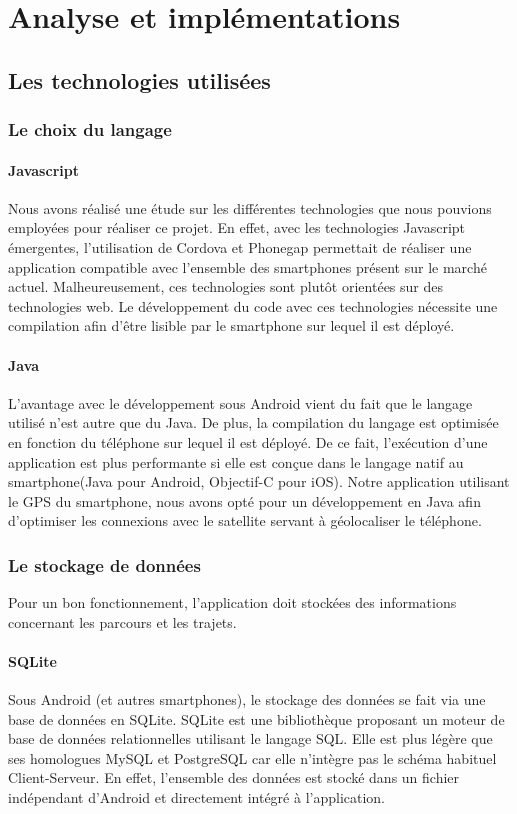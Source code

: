 \part{Analyse et implémentations}
\chapter{Les technologies utilisées}
\section{Le choix du langage}

\subsection{Javascript}
Nous avons réalisé une étude sur les différentes technologies que nous pouvions employées pour réaliser ce projet. En effet, avec les technologies Javascript émergentes, l'utilisation de Cordova et Phonegap permettait de réaliser une application compatible avec l'ensemble des smartphones présent sur le marché actuel. Malheureusement, ces technologies sont plutôt orientées sur des technologies web. Le développement du code avec ces technologies nécessite une compilation afin d'être lisible par le smartphone sur lequel il est déployé. 

\subsection{Java}
L'avantage avec le développement sous Android vient du fait que le langage utilisé n'est autre que du Java. De plus, la compilation du langage est optimisée en fonction du téléphone sur lequel il est déployé. De ce fait, l’exécution d'une application est plus performante si elle est conçue dans le langage natif au smartphone(Java pour Android, Objectif-C pour iOS). Notre application utilisant le GPS du smartphone, nous avons opté pour un développement en Java afin d'optimiser les connexions avec le satellite servant à géolocaliser le téléphone.

\section{Le stockage de données}
Pour un bon fonctionnement, l'application doit stockées des informations concernant les parcours et les trajets. 

\subsection{SQLite}
Sous Android (et autres smartphones), le stockage des données se fait via une base de données en SQLite. SQLite est une bibliothèque proposant un moteur de base de données relationnelles utilisant le langage SQL. Elle est plus légère que ses homologues MySQL et PostgreSQL car elle n'intègre pas le schéma habituel Client-Serveur. En effet, l'ensemble des données est stocké dans un fichier indépendant d'Android et directement intégré à l'application.

